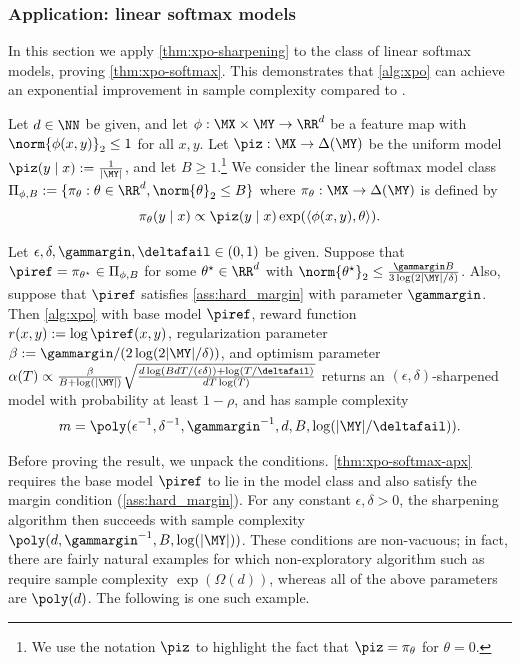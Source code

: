 \subsubsection{Application: linear softmax models}
\label{sec:xpo_linear}

In this section we apply \cref{thm:xpo-sharpening} to the class of linear softmax models, proving \cref{thm:xpo-softmax}. This demonstrates that \cref{alg:xpo} can achieve an exponential improvement in sample complexity compared to \bestofnalg.

\begin{definition}
Let $d \in \NN$ be given, and let $\phi: \MX \times \MY \to \RR^d$ be
a feature map with $\norm{\phi(x,y)}_2 \leq 1$ for all $x,y$. Let
$\piz: \MX \to \Delta(\MY)$ be the uniform model $\piz(y\mid x) :=
\frac{1}{|\MY|}$, and let $B \geq 1$.\footnote{We use the notation
  $\piz$ to highlight the fact that $\piz=\pi_\theta$ for $\theta=0$.}
  We consider the linear softmax model class $\Pi_{\phi,B} := \{\pi_\theta: \theta \in \RR^d, \norm{\theta}_2 \leq B\}$ where $\pi_\theta:\MX \to \Delta(\MY)$ is defined by
\[\pi_\theta(y\mid x) \propto \piz(y\mid x) \exp(\langle \phi(x,y), \theta\rangle).\]
\end{definition}

\begin{theorem}\label{thm:xpo-softmax-apx}
Let $\epsilon,\delta,\gammargin,\deltafail \in (0,1)$ be
given. Suppose that $\piref = \pi_{\theta^\star} \in \Pi_{\phi,B}$ for
some $\theta^\star \in \RR^d$ with $\norm{\theta^\star}_2 \leq
\frac{\gammargin B}{3\log(2|\MY|/\delta)}$. Also, suppose that
$\piref$ satisfies \cref{ass:hard_margin} with parameter
$\gammargin$. Then \cref{alg:xpo} with base model $\piref$, reward
function $r(x,y) := \log \piref(x,y)$, regularization parameter $\beta
:= \gammargin/(2\log(2|\MY|/\delta))$, and optimism parameter
$\alpha(T) \propto
\frac{\beta}{B+\log(|\MY|)}\sqrt{\frac{d\log(BdT/(\epsilon\delta))+\log(T/\deltafail)}{dT\log(T)}}$
returns an $(\epsilon,\delta)$-sharpened model with probability at
least $1-\rho$, and has sample complexity 
\[m = \poly(\epsilon^{-1},\delta^{-1},\gammargin^{-1}, d, B, \log(|\MY|/\deltafail)).\]
\end{theorem}

Before proving the result, we unpack the
conditions. \cref{thm:xpo-softmax-apx} requires the base model
$\piref$ to lie in the model class and also satisfy the margin
condition (\cref{ass:hard_margin}). For any constant
$\epsilon,\delta>0$, the sharpening algorithm then succeeds with
sample complexity $\poly(d, \gammargin^{-1}, B, \log(|\MY|))$. These
conditions are non-vacuous; in fact, there are fairly natural examples
for which
non-exploratory algorithm such as \bestofnalg require sample
complexity $\exp(\Omega(d))$, whereas all of the above parameters are
$\poly(d)$. The following is one such example.


